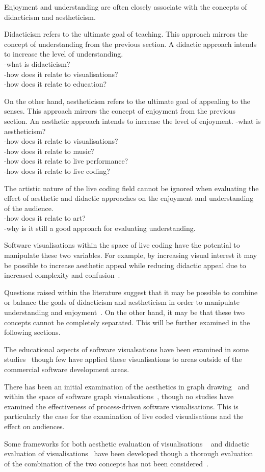 Enjoyment and understanding are often closely associate with the concepts of didacticism and aestheticism.

Didacticism refers to the ultimate goal of teaching. This approach mirrors the concept of understanding from the previous section. A didactic approach intends to increase the level of understanding.\\
-what is didacticism?\\
-how does it relate to visualisations?\\
-how does it relate to education?

On the other hand, aestheticism refers to the ultimate goal of appealing to the senses. This approach mirrors the concept of enjoyment from the previous section. An aesthetic approach intends to increase the level of enjoyment.
-what is aestheticism?\\
-how does it relate to visualisations?\\
-how does it relate to music?\\
-how does it relate to live performance?\\
-how does it relate to live coding? \cite{Bell}

The artistic nature of the live coding field cannot be ignored when evaluating the effect of aesthetic and didactic approaches on the enjoyment and understanding of the audience.\\
-how does it relate to art?\\
-why is it still a good approach for evaluating understanding.

Software visualisations within the space of live coding have the potential to manipulate these two variables. For example, by increasing visual interest it may be possible to increase aesthetic appeal while reducing didactic appeal due to increased complexity and confusion~.

Questions raised within the literature suggest that it may be possible to combine or balance the goals of didacticism and aestheticism in order to manipulate understanding and enjoyment~. On the other hand, it may be that these two concepts cannot be completely separated. This will be further examined in the following sections.

The educational aspects of software visualsations have been examined in some studies~ though few have applied these visualisations to areas outside of the commercial software development areas.

There has been an initial examination of the aesthetics in graph drawing~ and within the space of software graph visualsations~, though no studies have examined the effectiveness of process-driven software visualisations. This is particularly the case for the examination of live coded visualisations and the effect on audiences.

Some frameworks for both aesthetic evaluation of visualisations
~ and didactic evaluation of visualisations~ have been developed though a thorough evaluation of the combination of the two concepts has not been considered~.

